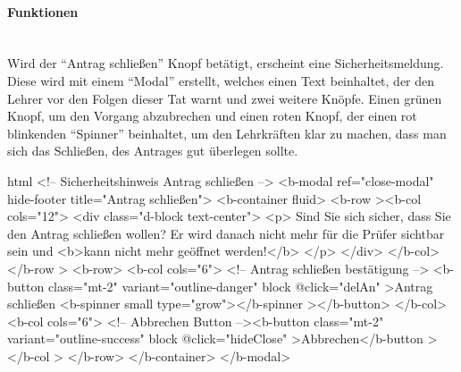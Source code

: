 \paragraph{Funktionen}
~\\
Wird der \enquote{Antrag schließen} Knopf betätigt, erscheint eine Sicherheitsmeldung. Diese wird mit einem \enquote{Modal} erstellt, welches einen Text beinhaltet, der den Lehrer vor den Folgen dieser Tat warnt und zwei weitere Knöpfe. Einen grünen Knopf, um den Vorgang abzubrechen und einen roten Knopf, der einen rot blinkenden \enquote{Spinner} beinhaltet, um den Lehrkräften klar zu machen, dass man sich das Schließen, des Antrages gut überlegen sollte.
\begin{code}{html}
	<!-- Sicherheitshinweis Antrag schließen -->
    <b-modal ref="close-modal" hide-footer title="Antrag schließen">
      <b-container fluid>
        <b-row
          ><b-col cols="12">
            <div class="d-block text-center">
              <p>
                Sind Sie sich sicher, dass Sie den Antrag schließen wollen? Er
                wird danach nicht mehr für die Prüfer sichtbar sein und
                <b>kann nicht mehr geöffnet werden!</b>
              </p>
            </div>
          </b-col></b-row
        >
        <b-row>
          <b-col cols="6">
            <!-- Antrag schließen bestätigung -->
            <b-button class="mt-2" variant="outline-danger" block @click="delAn"
              >Antrag schließen <b-spinner small type="grow"></b-spinner
            ></b-button>
          </b-col>
          <b-col cols="6">
            <!-- Abbrechen Button --><b-button
              class="mt-2"
              variant="outline-success"
              block
              @click="hideClose"
              >Abbrechen</b-button
            ></b-col
          >
        </b-row>
      </b-container>
    </b-modal>
\end{code}
	\label{list:securityalert} ~\\
~\\

\newpage

